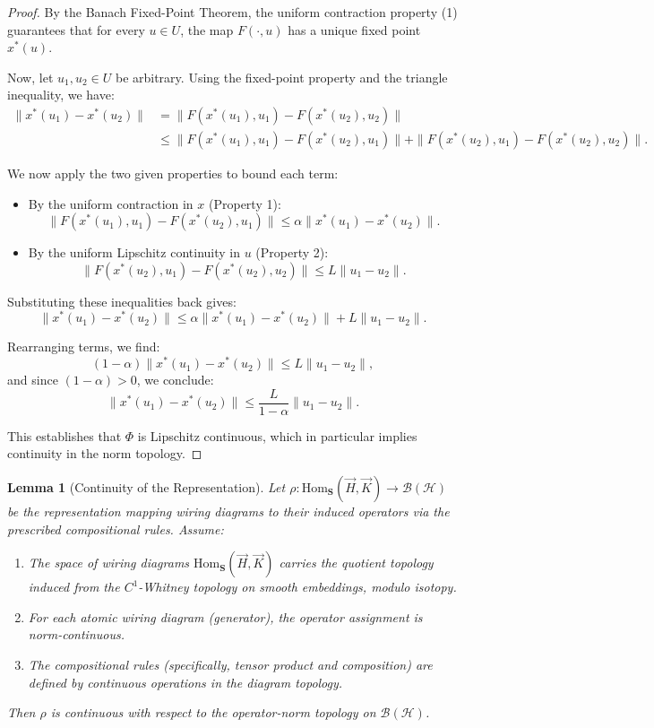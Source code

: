 \documentclass[11pt]{article}
\newtheorem{lemma}{Lemma}
\begin{document}
\begin{proof}
By the Banach Fixed-Point Theorem, the uniform contraction property (1) guarantees that for every $u \in U$, the map $F(\cdot, u)$ has a unique fixed point $x^*(u)$.

Now, let $u_1, u_2 \in U$ be arbitrary. Using the fixed-point property and the triangle inequality, we have:
\[
\begin{aligned}
\|x^*(u_1) - x^*(u_2)\| &= \|F(x^*(u_1), u_1) - F(x^*(u_2), u_2)\| \\
&\le \|F(x^*(u_1), u_1) - F(x^*(u_2), u_1)\| + \|F(x^*(u_2), u_1) - F(x^*(u_2), u_2)\|.
\end{aligned}
\]

We now apply the two given properties to bound each term:
%
\begin{itemize}
\item By the uniform contraction in $x$ (Property 1):
    \[
    \|F(x^*(u_1), u_1) - F(x^*(u_2), u_1)\| \le \alpha \|x^*(u_1) - x^*(u_2)\|.
    \]
\item By the uniform Lipschitz continuity in $u$ (Property 2):
    \[
    \|F(x^*(u_2), u_1) - F(x^*(u_2), u_2)\| \le L \|u_1 - u_2\|.
    \]
\end{itemize}

Substituting these inequalities back gives:
\[
\|x^*(u_1) - x^*(u_2)\| \le \alpha \|x^*(u_1) - x^*(u_2)\| + L \|u_1 - u_2\|.
\]

Rearranging terms, we find:
\[
(1 - \alpha) \|x^*(u_1) - x^*(u_2)\| \le L \|u_1 - u_2\|,
\]
and since $(1 - \alpha) > 0$, we conclude:
\[
\|x^*(u_1) - x^*(u_2)\| \le \frac{L}{1-\alpha} \|u_1 - u_2\|.
\]

This establishes that $\Phi$ is Lipschitz continuous, which in particular implies continuity in the norm topology.
\end{proof}


\begin{lemma}[Continuity of the Representation]\label{lem:rho-continuity}
Let $\rho : \mathrm{Hom}_{\mathbf{S}}(\vec{H}, \vec{K}) \to \mathcal{B}(\mathcal{H})$ be the representation mapping wiring diagrams to their induced operators via the prescribed compositional rules. Assume:
\begin{enumerate}
    \item The space of wiring diagrams $\mathrm{Hom}_{\mathbf{S}}(\vec{H}, \vec{K})$ carries the quotient topology induced from the $C^1$-Whitney topology on smooth embeddings, modulo isotopy.
    \item For each atomic wiring diagram (generator), the operator assignment is norm-continuous.
    \item The compositional rules (specifically, tensor product and composition) are defined by continuous operations in the diagram topology.
\end{enumerate}
Then $\rho$ is continuous with respect to the operator-norm topology on $\mathcal{B}(\mathcal{H})$.
\end{lemma}
\end{document}
